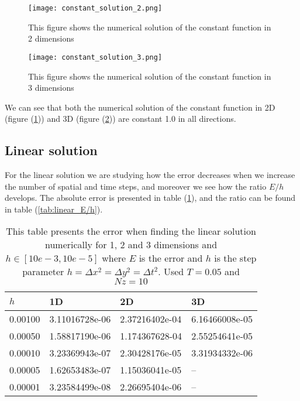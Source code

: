 \documentclass[norsk,a4paper,12pt]{article}
\begin{document}
\begin{figure}[H]
\centering
\texttt{[image: constant\_solution\_2.png]}
\caption{This figure shows the numerical solution of the constant function in 2 dimensions \label{fig:constant_error_2}}
\end{figure}
\begin{figure}[H]
\centering
\texttt{[image: constant\_solution\_3.png]}
\caption{This figure shows the numerical solution of the constant function in 3 dimensions \label{fig:constant_error_3}}
\end{figure}
We can see that both the numerical solution of the constant function in 2D (figure (\ref{fig:constant_error_2})) and 3D (figure (\ref{fig:constant_error_3})) are constant 1.0 in all directions. 

\subsection{Linear solution}
For the linear solution we are studying how the error decreases when we increase the number of spatial and time steps, and moreover we see how the ratio $E/h$ develops. The absolute error is presented in table (\ref{tab:linear_error}), and the ratio can be found in table (\ref{tab:linear_E/h}).
\begin{table}[H]
\centering
\caption{This table presents the error when finding the linear solution numerically for 1, 2 and 3 dimensions and $h\in[10e-3, 10e-5]$ where $E$ is the error and $h$ is the step parameter $h=\Delta x^2 = \Delta y^2 = \Delta t^2$. Used $T=0.05$ and $Nz=10$}
\begin{tabularx}{\textwidth}{XXXX} \hline
\label{tab:linear_error}
$h$ & 1D & 2D & 3D \\ \hline
0.00100 & 3.11016728e-06 & 2.37216402e-04 & 6.16466008e-05 \\
0.00050 & 1.58817190e-06 & 1.174367628-04 & 2.55254641e-05 \\
0.00010 & 3.23369943e-07 & 2.30428176e-05 & 3.31934332e-06 \\
0.00005 & 1.62653483e-07 & 1.15036041e-05 & -- \\
0.00001 & 3.23584499e-08 & 2.26695404e-06 & -- \\ \hline
\end{tabularx}
\end{table}
\end{document}
